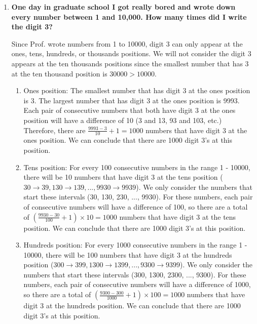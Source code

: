 \documentclass[10pt]{article}
\begin{document}
\begin{enumerate}
\begin{enumerate}
The problem becomes more difficult for $n > 7$ because we must consider the scenario of the word MATH appearing more than once in the same sequence. If $n=8$, we could have the sequence MATHMATH. If we added the possibilities for MATH starting at position 1 and MATH starting at position 5, we would count the sequence MATHMATH twice (once for each position). To solve this for larger $n$, we can no longer sum the positions ($4 \times 4^{n-4}$), but we also have to deal with overlaps, which is much more complicated computationally.

\vskip 1cm
\end{enumerate}


\item
\textbf{One day in graduate school I got really bored and wrote down every number between 1 and 10,000.  How many times did I write the digit 3?}

Since Prof. wrote numbers from 1 to 10000, digit 3 can only appear at the ones, tens, hundreds, or thousands positions. We will not consider the digit 3 appears at the ten thousands positions since the smallest number that has 3 at the ten thousand position is $30000 >  10000$.

\begin{enumerate}
    \item Ones position: The smallest number that has digit 3 at the ones position is 3. The largest number that has digit 3 at the ones position is 9993. Each pair of consecutive numbers that both have digit 3 at the ones position will have a difference of 10 (3 and 13, 93 and 103, etc.) Therefore, there are $\frac{9993 - 3}{10} + 1 = 1000$ numbers that have digit 3 at the ones position. We can conclude that there are 1000 digit 3's at this position.
    
    \item Tens position: For every 100 consecutive numbers in the range 1 - 10000, there will be 10 numbers that have digit 3 at the tens position ($30 \rightarrow 39, 130 \rightarrow 139, ..., 9930 \rightarrow 9939$). We only consider the numbers that start these intervals (30, 130, 230, ..., 9930). For these numbers, each pair of consecutive numbers will have a difference of 100, so there are a total of $(\frac{9930 - 30}{100} + 1) \times 10 = 1000$ numbers that have digit 3 at the tens position. We can conclude that there are 1000 digit 3's at this position.
    
    \item Hundreds position: For every 1000 consecutive numbers in the range 1 - 10000, there will be 100 numbers that have digit 3 at the hundreds position ($300 \rightarrow 399, 1300 \rightarrow 1399, ..., 9300 \rightarrow 9399$). We only consider the numbers that start these intervals (300, 1300, 2300, ..., 9300). For these numbers, each pair of consecutive numbers will have a difference of 1000, so there are a total of $(\frac{9300 - 300}{1000} + 1) \times 100 = 1000$ numbers that have digit 3 at the hundreds position. We can conclude that there are 1000 digit 3's at this position.
    

\end{enumerate}
\end{enumerate}
\end{document}
